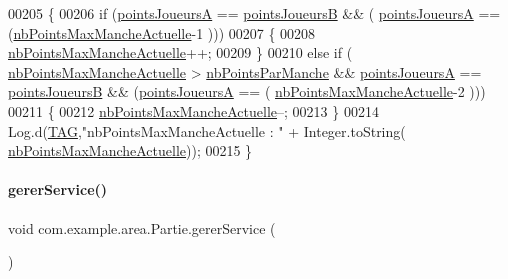 \begin{DoxyCode}
00205     \{
00206         \textcolor{keywordflow}{if} (\hyperlink{classcom_1_1example_1_1area_1_1_partie_ad1075e561acb71ac3307570f79795b1c}{pointsJoueursA} == \hyperlink{classcom_1_1example_1_1area_1_1_partie_ae1ceb321b45437487124b1d886c7297c}{pointsJoueursB} && (
      \hyperlink{classcom_1_1example_1_1area_1_1_partie_ad1075e561acb71ac3307570f79795b1c}{pointsJoueursA} == (\hyperlink{classcom_1_1example_1_1area_1_1_partie_a4b5e5464eb3b37f7c78d4134bf29a7f8}{nbPointsMaxMancheActuelle}-1 )))
00207         \{
00208             \hyperlink{classcom_1_1example_1_1area_1_1_partie_a4b5e5464eb3b37f7c78d4134bf29a7f8}{nbPointsMaxMancheActuelle}++;
00209         \}
00210         \textcolor{keywordflow}{else} \textcolor{keywordflow}{if} ( \hyperlink{classcom_1_1example_1_1area_1_1_partie_a4b5e5464eb3b37f7c78d4134bf29a7f8}{nbPointsMaxMancheActuelle} > 
      \hyperlink{classcom_1_1example_1_1area_1_1_partie_a23cd7e19042eece7057f810bba2f4f2c}{nbPointsParManche} && \hyperlink{classcom_1_1example_1_1area_1_1_partie_ad1075e561acb71ac3307570f79795b1c}{pointsJoueursA} == 
      \hyperlink{classcom_1_1example_1_1area_1_1_partie_ae1ceb321b45437487124b1d886c7297c}{pointsJoueursB} && (\hyperlink{classcom_1_1example_1_1area_1_1_partie_ad1075e561acb71ac3307570f79795b1c}{pointsJoueursA} == (
      \hyperlink{classcom_1_1example_1_1area_1_1_partie_a4b5e5464eb3b37f7c78d4134bf29a7f8}{nbPointsMaxMancheActuelle}-2 )))
00211         \{
00212             \hyperlink{classcom_1_1example_1_1area_1_1_partie_a4b5e5464eb3b37f7c78d4134bf29a7f8}{nbPointsMaxMancheActuelle}--;
00213         \}
00214         Log.d(\hyperlink{classcom_1_1example_1_1area_1_1_partie_ac0444402f7c570474df1c8b7ece88ad9}{TAG},\textcolor{stringliteral}{"nbPointsMaxMancheActuelle : "} + Integer.toString(
      \hyperlink{classcom_1_1example_1_1area_1_1_partie_a4b5e5464eb3b37f7c78d4134bf29a7f8}{nbPointsMaxMancheActuelle}));
00215     \}
\end{DoxyCode}
\mbox{\label{classcom_1_1example_1_1area_1_1_partie_a52c8e133b23468d4b2c4338a80c3763c}} 
\paragraph{\texorpdfstring{gerer\+Service()}{gererService()}}
{\footnotesize\ttfamily void com.\+example.\+area.\+Partie.\+gerer\+Service (\begin{DoxyParamCaption}{ }\end{DoxyParamCaption})\hspace{0.3cm}{\ttfamily [private]}}



